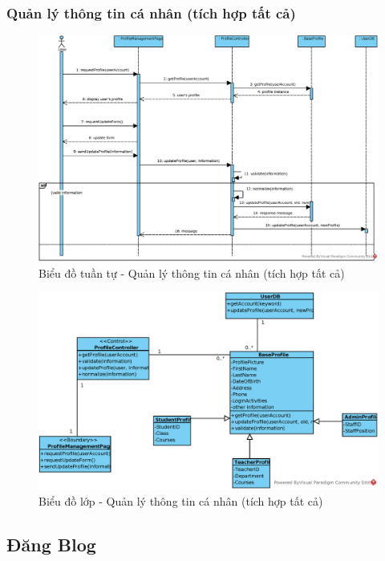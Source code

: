 \documentclass[./../main.tex]{subfiles}
\begin{document}
\subsubsection{Quản lý thông tin cá nhân (tích hợp tất cả)}
\begin{figure}[H]
    \centering
    \includegraphics[width=\linewidth]{./images/UseCaseDesignDiagram/ucr_per_update_profile.eps}
    \caption{Biểu đồ tuần tự - Quản lý thông tin cá nhân (tích hợp tất cả)}
\end{figure}
\begin{figure}[H]
    \centering
    \includegraphics[width=\linewidth]{./images/UseCaseDesignDiagram/ucd_per_profile.eps}
    \caption{Biểu đồ lớp - Quản lý thông tin cá nhân (tích hợp tất cả)}
\end{figure}

\subsection{Đăng Blog}
\end{document}
